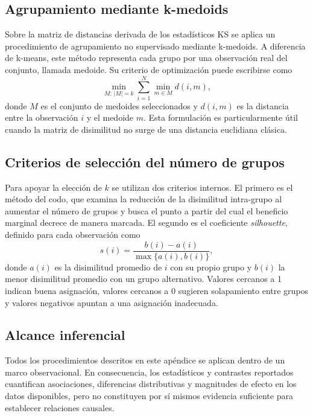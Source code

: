 \documentclass[8pt,a4paper]{article} %
\numberwithin{figure}{subsection}
\begin{document}
\subsection{Agrupamiento mediante k-medoids}
Sobre la matriz de distancias derivada de los estadísticos KS se aplica un procedimiento de agrupamiento no supervisado mediante k-medoids. A diferencia de k-means, este método representa cada grupo por una observación real del conjunto, llamada medoide. Su criterio de optimización puede escribirse como
\[
\min_{M:\,|M|=k}\sum_{i=1}^{N}\min_{m\in M} d(i,m),
\]
donde $M$ es el conjunto de medoides seleccionados y $d(i,m)$ es la distancia entre la observación $i$ y el medoide $m$. Esta formulación es particularmente útil cuando la matriz de disimilitud no surge de una distancia euclidiana clásica.

\subsection{Criterios de selección del número de grupos}
Para apoyar la elección de $k$ se utilizan dos criterios internos. El primero es el método del codo, que examina la reducción de la disimilitud intra-grupo al aumentar el número de grupos y busca el punto a partir del cual el beneficio marginal decrece de manera marcada. El segundo es el coeficiente \textit{silhouette}, definido para cada observación como
\[
s(i)=\frac{b(i)-a(i)}{\max\{a(i),b(i)\}},
\]
donde $a(i)$ es la disimilitud promedio de $i$ con su propio grupo y $b(i)$ la menor disimilitud promedio con un grupo alternativo. Valores cercanos a 1 indican buena asignación, valores cercanos a 0 sugieren solapamiento entre grupos y valores negativos apuntan a una asignación inadecuada.

\subsection{Alcance inferencial}
Todos los procedimientos descritos en este apéndice se aplican dentro de un marco observacional. En consecuencia, los estadísticos y contrastes reportados cuantifican asociaciones, diferencias distributivas y magnitudes de efecto en los datos disponibles, pero no constituyen por sí mismos evidencia suficiente para establecer relaciones causales.
\end{document}
